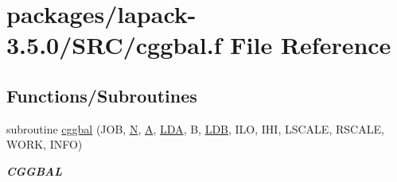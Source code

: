\hypertarget{cggbal_8f}{}\section{packages/lapack-\/3.5.0/\+S\+R\+C/cggbal.f File Reference}
\label{cggbal_8f}
\subsection*{Functions/\+Subroutines}
\begin{DoxyCompactItemize}
\item 
subroutine \hyperlink{group__complexGBcomputational_ga21dcc1c7c6d715a0c71c325d1d2adcbf}{cggbal} (J\+O\+B, \hyperlink{polmisc_8c_a0240ac851181b84ac374872dc5434ee4}{N}, \hyperlink{classA}{A}, \hyperlink{example__user_8c_ae946da542ce0db94dced19b2ecefd1aa}{L\+D\+A}, B, \hyperlink{example__user_8c_a50e90a7104df172b5a89a06c47fcca04}{L\+D\+B}, I\+L\+O, I\+H\+I, L\+S\+C\+A\+L\+E, R\+S\+C\+A\+L\+E, W\+O\+R\+K, I\+N\+F\+O)
\begin{DoxyCompactList}\small\item\em {\bfseries C\+G\+G\+B\+A\+L} \end{DoxyCompactList}\end{DoxyCompactItemize}
